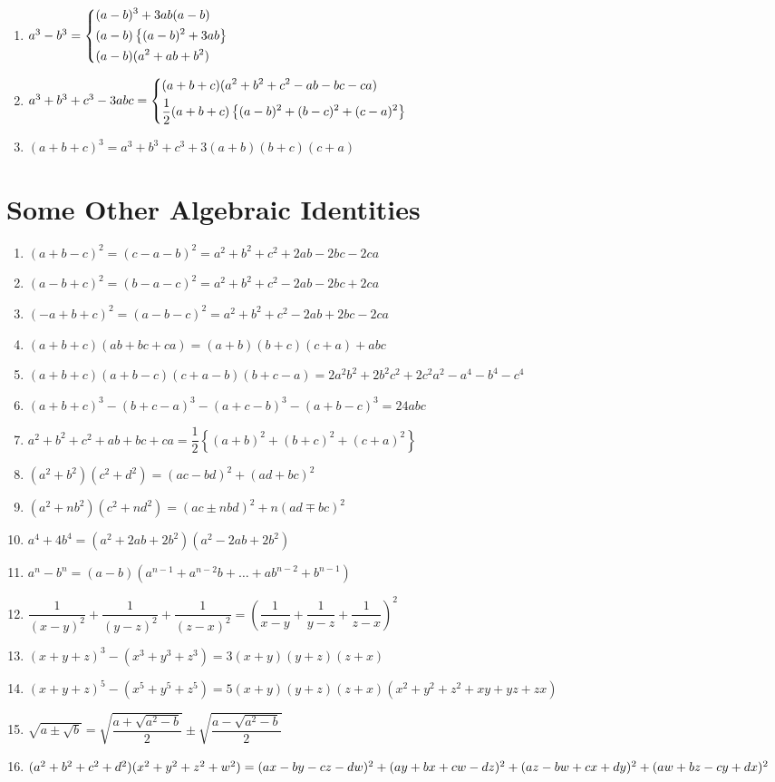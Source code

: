 \begin{formulasheet}
\begin{enumerate}
	\item $a^3-b^3= \begin{dcases}
		(a-b)^3+3ab(a-b) & \\
		(a-b)\left\{(a-b)^2+3ab\right\}& \\
		(a-b)(a^2+ab+b^2) &\\
	\end{dcases}$
	\item $a^3+b^3+c^3-3abc = \begin{dcases}
		(a+b+c)(a^2+b^2+c^2-ab-bc-ca) &\\
		\dfrac{1}{2}(a+b+c)\left\{(a-b)^2+(b-c)^2+(c-a)^2\right\}
	\end{dcases}$
	\item $(a+b+c)^3=a^3+b^3+c^3+3(a+b)(b+c)(c+a)$
\end{enumerate}
\end{formulasheet}
\section{Some Other Algebraic Identities}
\begin{formulasheet}
\begin{enumerate}
\item $(a+b-c)^2=(c-a-b)^2=a^2+b^2+c^2+2ab-2bc-2ca$
\item $(a-b+c)^2=(b-a-c)^2=a^2+b^2+c^2-2ab-2bc+2ca$
\item $(-a+b+c)^2=(a-b-c)^2=a^2+b^2+c^2-2ab+2bc-2ca$
\item $(a+b+c)(ab+bc+ca)=(a+b)(b+c)(c+a)+abc$
\item $(a+b+c)(a+b-c)(c+a-b)(b+c-a)= 2a^2b^2+2b^2c^2+2c^2a^2-a^4-b^4-c^4$
\item \((a+b+c)^3 - (b+c-a)^3 - (a+c-b)^3 - (a+b-c)^3 = 24abc\)
\item $a^2+b^2+c^2+ab+bc+ca= \dfrac{1}{2} \left\{(a+b)^2+(b+c)^2+(c+a)^2\right\}$
\item $(a^2 + b^2)(c^2 + d^2) = (ac - bd)^2 + (ad + bc)^2$
\item $(a^2 + nb^2)(c^2 + nd^2) = (ac \pm nbd)^2 + n(ad \mp bc)^2$
\item $a^4 + 4b^4 = (a^2 + 2ab + 2b^2)(a^2 - 2ab + 2b^2)$
\item \(a^n - b^n = (a-b)(a^{n-1} + a^{n-2}b + \dots + ab^{n-2} + b^{n-1})\)
\item \(\dfrac{1}{(x-y)^{2}}+\dfrac{1}{(y-z)^{2}}+\dfrac{1}{(z-x)^{2}}=\left(\dfrac{1}{x-y}+\dfrac{1}{y-z}+\dfrac{1}{z-x}\right)^{2}\)
\item $(x + y + z)^3 - (x^3 + y^3 + z^3)=3(x + y)(y + z)(z + x)$
\item $(x + y + z)^5 - (x^5 + y^5 + z^5)=5(x + y)(y + z)(z + x)(x^2 + y^2 + z^2 + xy + yz + zx)$
\item \(\sqrt{a \pm \sqrt{b}} = \sqrt{\dfrac{a+\sqrt{a^2-b}}{2}} \pm \sqrt{\dfrac{a-\sqrt{a^2-b}}{2}}\)
\item \((a^2+b^2+c^2+d^2)(x^2+y^2+z^2+w^2) = (ax-by-cz-dw)^2 + \\ (ay+bx+cw-dz)^2 + (az-bw+cx+dy)^2 + (aw+bz-cy+dx)^2\)

\end{enumerate}
\end{formulasheet}

